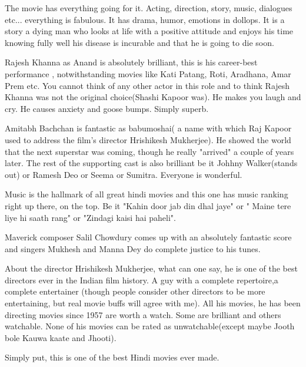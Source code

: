 \documentclass{article}
\begin{document}
The movie has everything going for it. Acting, direction, story, music, dialogues etc... everything is fabulous. It has drama, humor, emotions in dollops. It is a story a dying man who looks at life with a positive attitude and enjoys his time knowing fully well his disease is incurable and that he is going to die soon.

Rajesh Khanna as Anand is absolutely brilliant, this is his career-best performance , notwithstanding movies like Kati Patang, Roti, Aradhana, Amar Prem etc. You cannot think of any other actor in this role and to think Rajesh Khanna was not the original choice(Shashi Kapoor was). He makes you laugh and cry. He causes anxiety and goose bumps. Simply superb.

Amitabh Bachchan is fantastic as babumoshai( a name with which Raj Kapoor used to address the film's director Hrishikesh Mukherjee). He showed the world that the next superstar was coming, though he really "arrived" a couple of years later. The rest of the supporting cast is also brilliant be it Johhny Walker(stands out) or Ramesh Deo or Seema or Sumitra. Everyone is wonderful.

Music is the hallmark of all great hindi movies and this one has music ranking right up there, on the top. Be it "Kahin door jab din dhal jaye" or " Maine tere liye hi saath rang" or "Zindagi kaisi hai paheli".

Maverick composer Salil Chowdury comes up with an absolutely fantastic score and singers Mukhesh and Manna Dey do complete justice to his tunes.

About the director Hrishikesh Mukherjee, what can one say, he is one of the best directors ever in the Indian film history. A guy with a complete repertoire,a complete entertainer (though people consider other directors to be more entertaining, but real movie buffs will agree with me). All his movies, he has been directing movies since 1957 are worth a watch. Some are brilliant and others watchable. None of his movies can be rated as unwatchable(except maybe Jooth bole Kauwa kaate and Jhooti).

Simply put, this is one of the best Hindi movies ever made.
\end{document}
